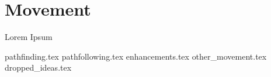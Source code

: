 \section{Movement}
Lorem Ipsum

{pathfinding.tex}
{pathfollowing.tex}
{enhancements.tex}
{other_movement.tex}
{dropped_ideas.tex}

